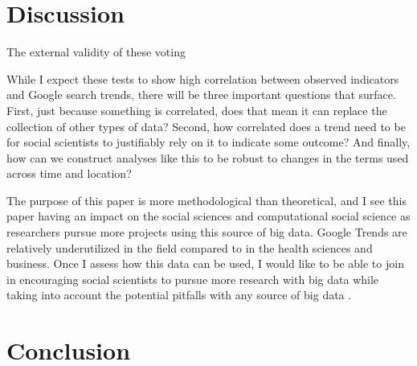 \section{Discussion}

The external validity of these voting 


While I expect these tests to show high correlation between observed
indicators and Google search trends, there will be three important
questions that surface. First, just because something is correlated,
does that mean it can replace the collection of other types of data?
Second, how correlated does a trend need to be for social scientists to
justifiably rely on it to indicate some outcome? And finally, how can we
construct analyses like this to be robust to changes in the terms used
across time and location?

The purpose of this paper is more methodological than theoretical, and I
see this paper having an impact on the social sciences and computational
social science as researchers pursue more projects using this source of
big data. Google Trends are relatively underutilized in the field
compared to in the health sciences and business. Once I assess how this
data can be used, I would like to be able to join
\citet{bailCulturalEnvironmentMeasuring2014} in encouraging social scientists
to pursue more research with big data while taking into account the
potential pitfalls with any source of big data
\citep{mcfarlandBigDataDanger2015}.

\section{Conclusion}